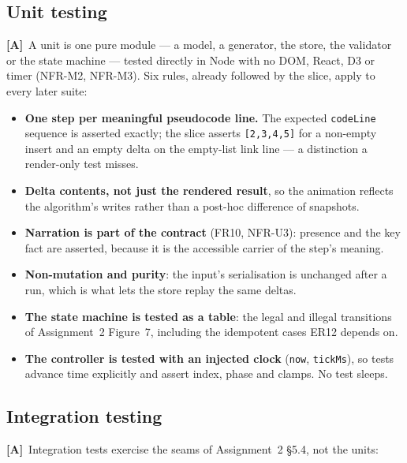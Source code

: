\documentclass[11pt,a4paper]{article}
\newcommand{\A}{\textcolor{asmc}{\textbf{[A]}}}     %
\newcommand{\ct}[1]{\texttt{#1}}
\begin{document}
\subsection{Unit testing}

\A\ A unit is one pure module --- a model, a generator, the store, the validator or the state
machine --- tested directly in Node with no DOM, React, D3 or timer (NFR-M2, NFR-M3). Six
rules, already followed by the slice, apply to every later suite:

\begin{itemize}[leftmargin=1.4em,topsep=2pt,itemsep=1pt]
  \item \textbf{One step per meaningful pseudocode line.} The expected \ct{codeLine} sequence
        is asserted exactly; the slice asserts \ct{[2,3,4,5]} for a non-empty insert and an
        empty delta on the empty-list link line --- a distinction a render-only test misses.
  \item \textbf{Delta contents, not just the rendered result}, so the animation reflects the
        algorithm's writes rather than a post-hoc difference of snapshots.
  \item \textbf{Narration is part of the contract} (FR10, NFR-U3): presence and the key fact
        are asserted, because it is the accessible carrier of the step's meaning.
  \item \textbf{Non-mutation and purity}: the input's serialisation is unchanged after a run,
        which is what lets the store replay the same deltas.
  \item \textbf{The state machine is tested as a table}: the legal and illegal transitions of
        Assignment~2 Figure~7, including the idempotent cases ER12 depends on.
  \item \textbf{The controller is tested with an injected clock} (\ct{now}, \ct{tickMs}), so
        tests advance time explicitly and assert index, phase and clamps. No test sleeps.
\end{itemize}

\subsection{Integration testing}

\A\ Integration tests exercise the seams of Assignment~2 \S5.4, not the units:
\end{document}
